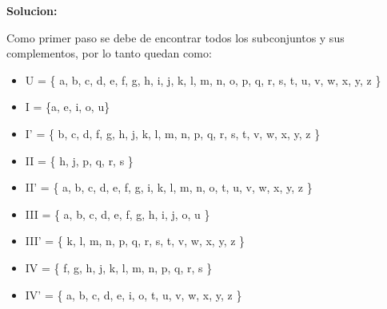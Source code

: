 \documentclass{article}%
\begin{document}
\vspace{0.4in}

\textbf{Solucion:} 
\vspace{0.3in}

Como primer paso se debe de encontrar todos los subconjuntos y sus complementos, por lo tanto quedan como:


\begin{itemize}
    \item U = \{ a, b, c, d, e, f, g, h, i, j, k, l, m, n, o, p, q, r, s, t, u, v, w, x, y, z \} 
\end{itemize}


\begin{itemize}

    \item I = \{a, e, i, o, u\}
    \item I' = \{ b, c, d, f, g, h, j, k, l, m, n, p, q, r, s, t, v, w, x, y, z \} 

    \item II = \{ h, j, p, q, r, s  \}
    \item II' = \{ a, b, c, d, e, f, g, i, k, l, m, n, o, t, u, v, w, x, y, z \} 

    \item III = \{ a, b, c, d, e, f, g, h, i, j, o, u  \}       
    \item III' = \{ k, l, m, n, p, q, r, s, t, v, w, x, y, z \}

    \item IV = \{ f, g, h, j, k, l, m, n, p, q, r, s  \}
    \item IV' = \{ a, b, c, d, e, i, o, t, u, v, w, x, y, z \} 

\end{itemize}













\newpage






\newpage
\end{document}
